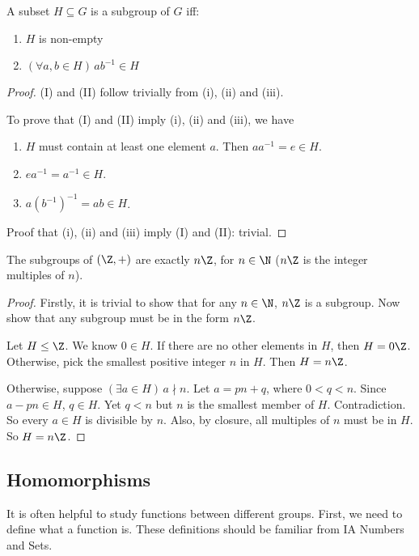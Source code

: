 \documentclass[a4paper]{article}
\begin{document}
\begin{lemma}
  A subset $H\subseteq G$ is a subgroup of $G$ iff:
  \begin{enumerate}[label=(\Roman{*})]
    \item $H$ is non-empty
    \item $(\forall a, b\in H)\,ab^{-1}\in H$
  \end{enumerate}
\end{lemma}
\begin{proof}
  (I) and (II) follow trivially from (i), (ii) and (iii).

  To prove that (I) and (II) imply (i), (ii) and (iii), we have
  \begin{enumerate}
    \item $H$ must contain at least one element $a$. Then $aa^{-1} = e \in H$.
      \setcounter{enumi}{2}
    \item $ea^{-1} = a^{-1} \in H$.
      \setcounter{enumi}{1}
    \item $a(b^{-1})^{-1} = ab\in H$.
  \end{enumerate}

  Proof that (i), (ii) and (iii) imply (I) and (II): trivial.
\end{proof}
\begin{prop}
  The subgroups of $(\Z, +)$ are exactly $n\Z$, for $n\in \N$ ($n\Z$ is the integer multiples of $n$).
\end{prop}
\begin{proof}
  Firstly, it is trivial to show that for any $n \in \N$, $n\Z$ is a subgroup. Now show that any subgroup must be in the form $n\Z$.

  Let $H\leq \Z$. We know $0\in H$. If there are no other elements in $H$, then $H = 0\Z$. Otherwise, pick the smallest positive integer $n$ in $H$. Then $H=n\Z$.

  Otherwise, suppose $(\exists a\in H)\,a \nmid n$. Let $a = pn + q$, where $0 < q < n$. Since $a - pn\in H$, $q\in H$. Yet $q < n$ but $n$ is the smallest member of $H$. Contradiction. So every $a\in H$ is divisible by $n$. Also, by closure, all multiples of $n$ must be in $H$. So $H = n\Z$.
\end{proof}
\subsection{Homomorphisms}
It is often helpful to study functions between different groups. First, we need to define what a function is. These definitions should be familiar from IA Numbers and Sets.
\end{document}
